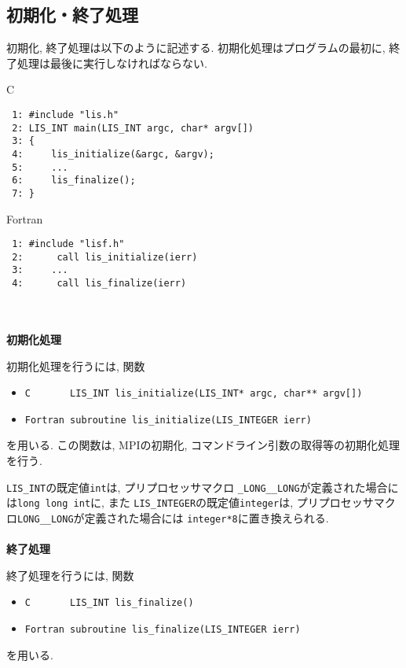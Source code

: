 \documentclass[a4paper]{jarticle}
\begin{document}
{{\subsection{初期化・終了処理}
初期化, 終了処理は以下のように記述する. 初期化処理はプログラムの最初に, 
終了処理は最後に実行しなければならない. 
\begin{itembox}[l]{C}
\small
\begin{verbatim}
 1: #include "lis.h"
 2: LIS_INT main(LIS_INT argc, char* argv[])
 3: {
 4:     lis_initialize(&argc, &argv);
 5:     ...
 6:     lis_finalize();
 7: }
\end{verbatim}
\end{itembox}
\begin{itembox}[l]{Fortran}
\small
\begin{verbatim}
 1: #include "lisf.h"
 2:      call lis_initialize(ierr) 
 3:     ...
 4:      call lis_finalize(ierr)
\end{verbatim}
\end{itembox}
\\ \\
\noindent
{\bf 初期化処理}

初期化処理を行うには, 関数
\begin{itemize}
\item \verb+C       LIS_INT lis_initialize(LIS_INT* argc, char** argv[])+
\item \verb+Fortran subroutine lis_initialize(LIS_INTEGER ierr)+
\end{itemize}
を用いる. 
この関数は, MPIの初期化, コマンドライン引数の取得等の初期化処理を行う. 

{\tt LIS\_INT}の既定値{\tt int}は, プリプロセッサマクロ
{\tt \_LONG\_\_LONG}が定義された場合には{\tt long long int}に, また
{\tt LIS\_INTEGER}の既定値{\tt integer}は, 
プリプロセッサマクロ{\tt LONG\_\_LONG}が定義された場合には
{\tt integer*8}に置き換えられる. 
\\ \\
\noindent
{\bf 終了処理}

終了処理を行うには, 関数
\begin{itemize}
\item \verb+C       LIS_INT lis_finalize()+
\item \verb+Fortran subroutine lis_finalize(LIS_INTEGER ierr)+
\end{itemize}
を用いる. 

}}
\end{document}
